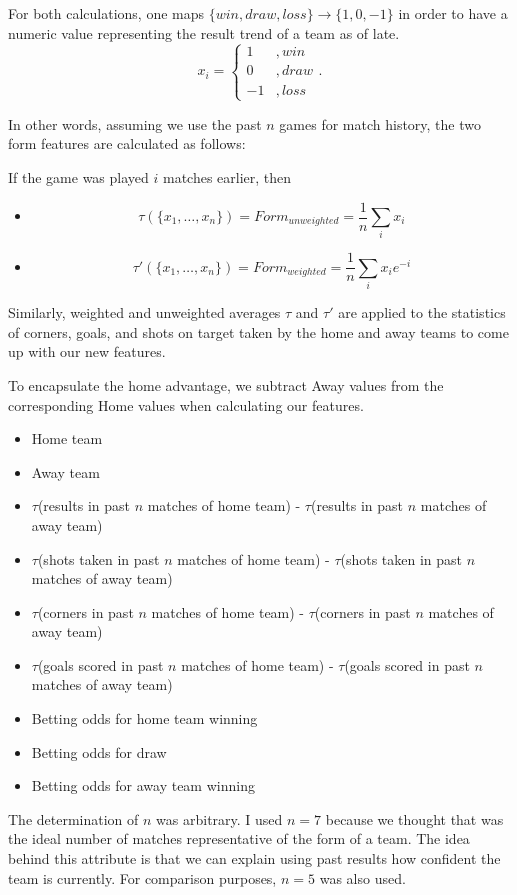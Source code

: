 \documentclass[paper=a4, fontsize=11pt]{scrartcl}
\numberwithin{equation}{section}		%
\numberwithin{figure}{section}			%
\numberwithin{table}{section}				%
\begin{document}
For both calculations, one maps $\{win, draw, loss\} \to \{1, 0, -1\}$ in order to have a numeric value representing the result trend of a team as of late. $$x_i = \begin{cases} 1&, win \\ 0&, draw \\ -1&, loss \end{cases}.$$

In other words, assuming we use the past $n$ games for match history, the two form features are calculated as follows:

If the game was played $i$ matches earlier, then
\begin{itemize}
\item $$\tau(\{ x_1,\ldots,x_n\}) = Form_{unweighted} = \frac{1}{n} \sum_i x_i$$
\item $$\tau'(\{ x_1,\ldots,x_n\}) = Form_{weighted} = \frac{1}{n} \sum_i x_i e^{-i}$$
\end{itemize}

Similarly, weighted and unweighted averages $\tau$ and $\tau'$ are applied to the statistics of corners, goals, and shots on target taken by the home and away teams to come up with our new features.

To encapsulate the home advantage, we subtract Away values from the corresponding Home values when calculating our features.

\begin{itemize}
\item Home team
\item Away team
\item $\tau$(results in past $n$ matches of home team) - $\tau$(results in past $n$ matches of away team)
\item $\tau$(shots taken in past $n$ matches of home team) - $\tau$(shots taken in past $n$ matches of away team)
\item $\tau$(corners in past $n$ matches of home team) - $\tau$(corners in past $n$ matches of away team)
\item $\tau$(goals scored in past $n$ matches of home team) - $\tau$(goals scored in past $n$ matches of away team)
\item Betting odds for home team winning
\item Betting odds for draw
\item Betting odds for away team winning
\end{itemize}

The determination of $n$ was arbitrary. I used $n=7$ because we thought that was the ideal number of matches representative of the form of a team. The idea behind this attribute is that we can explain using past results how confident the team is currently. For comparison purposes, $n=5$ was also used.
\end{document}

